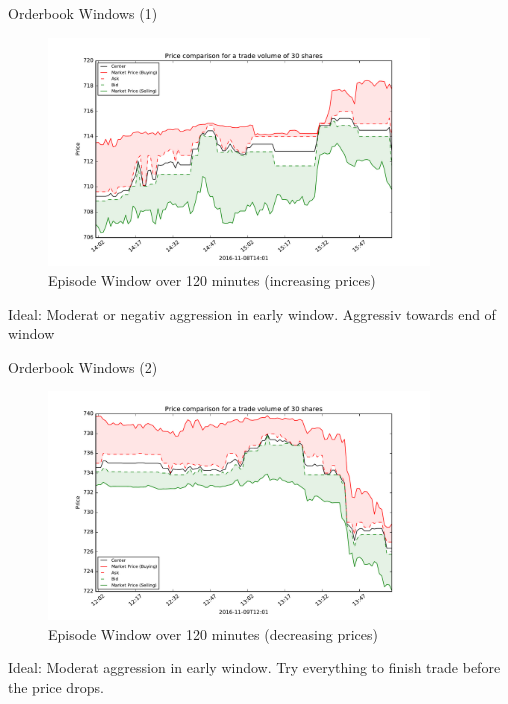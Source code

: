 \documentclass[10pt]{beamer}
\begin{document}
\begin{frame}[fragile]{Orderbook Windows (1)}

\begin{figure}[ht]
	\centering
   \includegraphics[width=0.9\textwidth]{images/episode_window2.pdf}
	\caption{Episode Window over 120 minutes (increasing prices)}
	\label{fig1}
\end{figure}

Ideal: Moderat or negativ aggression in early window. Aggressiv towards end of window

\end{frame}

\begin{frame}[fragile]{Orderbook Windows (2)}

\begin{figure}[ht]
	\centering
   \includegraphics[width=0.9\textwidth]{images/episode_window13.pdf}
	\caption{Episode Window over 120 minutes (decreasing prices)}
	\label{fig1}
\end{figure}

Ideal: Moderat aggression in early window. Try everything to finish trade before the price drops.

\end{frame}
\end{document}
